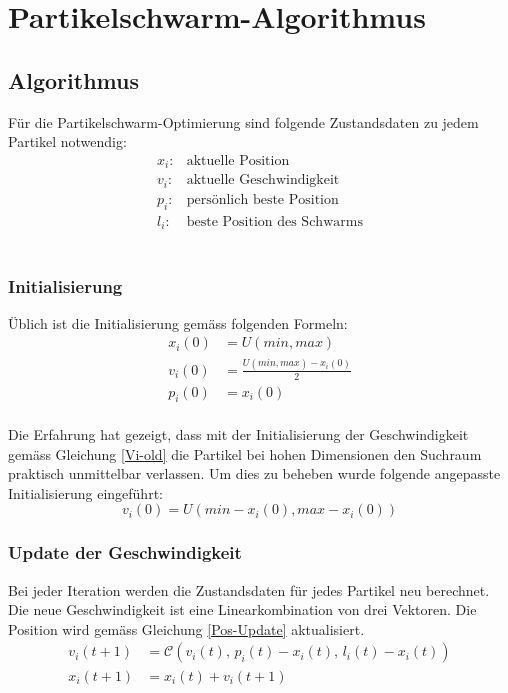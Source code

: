 \section{Partikelschwarm-Algorithmus}

\subsection{Algorithmus}
Für die Partikelschwarm-Optimierung sind folgende Zustandsdaten zu jedem Partikel notwendig: \\
\begin{align*}
	x_i: & \text{aktuelle Position}\\
	v_i: & \text{aktuelle Geschwindigkeit}\\
	p_i: & \text{persönlich beste Position} \\
	l_i: & \text{beste Position des Schwarms}
\end{align*} \\

\subsubsection{Initialisierung}
Üblich ist die Initialisierung gemäss folgenden Formeln: \\
\begin{align}
	x_i(0) &= U(min,max) \\
	v_i(0) &= \frac{U(min,max) - x_i(0)}{2} \label{Vi-old} \\ 
	p_i(0) &= x_i(0)
\end{align} \\
Die Erfahrung hat gezeigt, dass mit der Initialisierung der Geschwindigkeit gemäss Gleichung \ref{Vi-old} die Partikel bei hohen Dimensionen den Suchraum praktisch unmittelbar verlassen. Um dies zu beheben wurde folgende angepasste Initialisierung eingeführt: \\
\begin{equation}
	v_i(0) = U(min - x_i(0), max - x_i(0))
\end{equation}

\subsubsection{Update der Geschwindigkeit}
Bei jeder Iteration werden die Zustandsdaten für jedes Partikel neu berechnet. Die neue Geschwindigkeit ist eine Linearkombination von drei Vektoren. Die Position wird gemäss Gleichung \ref{Pos-Update} aktualisiert. \\
\begin{align}
	v_{i}(t+1) &= \mathcal{C}(v_i(t),\, p_i(t)-x_i(t),\, l_i(t)-x_i(t)) \\
	x_{i}(t+1) &= x_i(t) + v_i(t+1) \label{Pos-Update}
\end{align}

